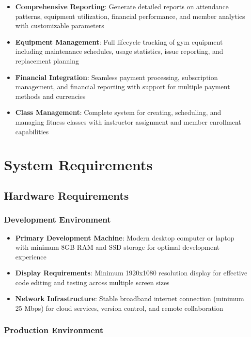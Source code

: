 \documentclass[12pt,a4paper]{report}
\begin{document}
\begin{itemize}[leftmargin=*]
    \item \textbf{Comprehensive Reporting}: Generate detailed reports on attendance patterns, equipment utilization, financial performance, and member analytics with customizable parameters
    \item \textbf{Equipment Management}: Full lifecycle tracking of gym equipment including maintenance schedules, usage statistics, issue reporting, and replacement planning
    \item \textbf{Financial Integration}: Seamless payment processing, subscription management, and financial reporting with support for multiple payment methods and currencies
    \item \textbf{Class Management}: Complete system for creating, scheduling, and managing fitness classes with instructor assignment and member enrollment capabilities
\end{itemize}

\section{System Requirements}
\label{sec:system-requirements}

\subsection{Hardware Requirements}

\subsubsection{Development Environment}

\begin{itemize}[leftmargin=*]
    \item \textbf{Primary Development Machine}: Modern desktop computer or laptop with minimum 8GB RAM and SSD storage for optimal development experience
    \item \textbf{Display Requirements}: Minimum 1920x1080 resolution display for effective code editing and testing across multiple screen sizes
    \item \textbf{Network Infrastructure}: Stable broadband internet connection (minimum 25 Mbps) for cloud services, version control, and remote collaboration
\end{itemize}

\subsubsection{Production Environment}
\end{document}
